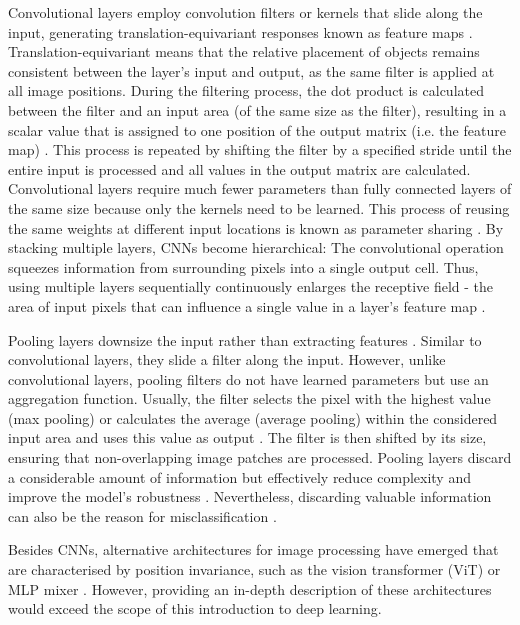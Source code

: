 Convolutional layers employ convolution filters or kernels that slide along the input, generating translation-equivariant \cite{gerber_stride_2020} responses known as feature maps \cite{zhang_parallel_1990}.
Translation-equivariant means that the relative placement of objects remains consistent between the layer's input and output, as the same filter is applied at all image positions.
During the filtering process, the dot product is calculated between the filter and an input area (of the same size as the filter), resulting in a scalar value that is assigned to one position of the output matrix (i.e. the feature map) \cite{goodfellow_deep_2016}.
This process is repeated by shifting the filter by a specified stride until the entire input is processed and all values in the output matrix are calculated.
Convolutional layers require much fewer parameters than fully connected layers of the same size because only the kernels need to be learned.
This process of reusing the same weights at different input locations is known as parameter sharing .
By stacking multiple layers, CNNs become hierarchical: The convolutional operation squeezes information from surrounding pixels into a single output cell. Thus, using multiple layers sequentially continuously enlarges the receptive field - the area of input pixels that can influence a single value in a layer's feature map .

Pooling layers downsize the input rather than extracting features .
Similar to convolutional layers, they slide a filter along the input.
However, unlike convolutional layers, pooling filters do not have learned parameters but use an aggregation function.
Usually, the filter selects the pixel with the highest value (max pooling) or calculates the average (average pooling) within the considered input area and uses this value as output \cite{ciresan_flexible_2011}.
The filter is then shifted by its size, ensuring that non-overlapping image patches are processed.
Pooling layers discard a considerable amount of information but effectively reduce complexity and improve the model's robustness \cite{ciresan_flexible_2011}.
Nevertheless, discarding valuable information can also be the reason for misclassification .

Besides CNNs, alternative architectures for image processing have emerged that are characterised by position invariance, such as the vision transformer (ViT)  or MLP mixer . However, providing an in-depth description of these architectures would exceed the scope of this introduction to deep learning.

